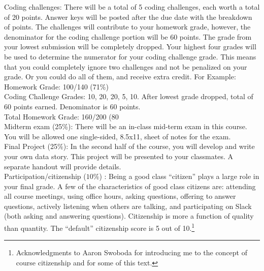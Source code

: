 \documentclass[10pt]{article}
\begin{document}
\noindent Coding challenges: There will be a total of 5 coding challenges, each worth a total of 20 points. Answer keys will be posted after the due date with the breakdown of points. The challenges will contribute to your homework grade, however, the denominator for the coding challenge portion will be 60 points. The grade from your lowest submission will be completely dropped. Your highest four grades will be used to determine the numerator for your coding challenge grade. This means that you could completely ignore two challenges and not be penalized on your grade. Or you could do all of them, and receive extra credit. 
For Example:\\  
Homework Grade: 100/140 (71\%) \\
Coding Challenge Grades: 10, 20, 20, 5, 10. After lowest grade dropped, total of 60 points earned. Denominator is 60 points.\\
Total Homework Grade: 160/200 (80%
\\

\noindent Midterm exam (25\%): There will be an in-class mid-term exam in this course. You will be allowed one single-sided, 8.5x11, sheet of notes for the exam.\\

\noindent Final Project (25\%): In the second half of the course, you will develop and write your own data story. This project will be presented to your classmates. A separate handout will provide details. \\

\noindent Participation/citizenship ($10\%$) : Being a good class ``citizen'' plays a large role in your final grade. A few of the characteristics of good class citizens are: attending all course meetings, using office hours, asking questions, offering to answer questions, actively listening when others are talking, and participating on Slack (both asking and answering questions). Citizenship is more a function of quality than quantity. The ``default'' citizenship score is 5 out of 10.\footnote{Acknowledgments to Aaron Swoboda for introducing me to the concept of course citizenship and for some of this text.} \\
\end{document}

